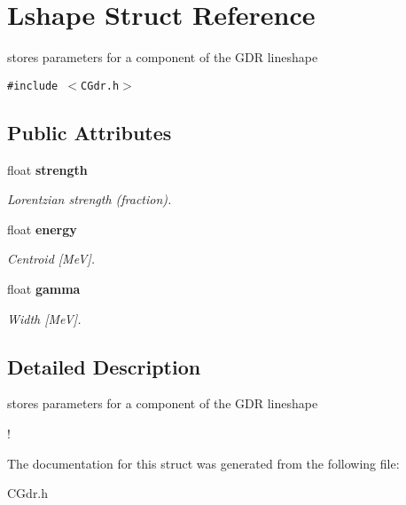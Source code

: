 \section{Lshape Struct Reference}
\label{structLshape}
stores parameters for a component of the GDR lineshape  


{\tt \#include $<$CGdr.h$>$}

\subsection*{Public Attributes}
\begin{CompactItemize}
\item 
float \bf{strength}\label{structLshape_09674669ab8a76c978060275377025f2}

\begin{CompactList}\small\item\em Lorentzian strength (fraction). \item\end{CompactList}\item 
float \bf{energy}\label{structLshape_9aa938880ac1a7df142db4a0dbd78318}

\begin{CompactList}\small\item\em Centroid [Me\-V]. \item\end{CompactList}\item 
float \bf{gamma}\label{structLshape_4c7947ce58860531b51bdc8c3f02e84e}

\begin{CompactList}\small\item\em Width [Me\-V]. \item\end{CompactList}\end{CompactItemize}


\subsection{Detailed Description}
stores parameters for a component of the GDR lineshape 

! 



The documentation for this struct was generated from the following file:\begin{CompactItemize}
\item 
CGdr.h\end{CompactItemize}
